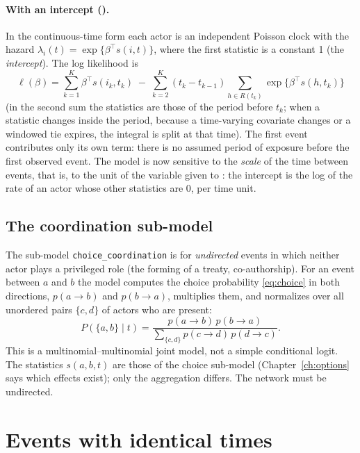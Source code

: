 \paragraph{With an intercept ().} In the continuous-time form each actor is an independent Poisson clock with the hazard $\lambda_i(t)=\exp\{\beta^{\top}s(i,t)\}$, where the first statistic is a constant 1 (the \emph{intercept}). The log likelihood is
\begin{equation}\label{eq:rateint}
  \ell(\beta)=\sum_{k=1}^{K}\beta^{\top}s(i_k,t_k)\;-\;\sum_{k=2}^{K}(t_k-t_{k-1})\sum_{h\in R(t_k)}\exp\{\beta^{\top}s(h,t_k)\}
\end{equation}
(in the second sum the statistics are those of the period before $t_k$; when a statistic changes inside the period, because a time-varying covariate changes or a windowed tie expires, the integral is split at that time). The first event contributes only its own term: there is no assumed period of exposure before the first observed event. The model is now sensitive to the \emph{scale} of the time between events, that is, to the unit of the variable given to : the intercept is the log of the rate of an actor whose other statistics are 0, per time unit.

\subsection{The coordination sub-model}\label{sec:coordmodel}

The sub-model \texttt{choice\_coordination} is for \emph{undirected} events in which neither actor plays a privileged role (the forming of a treaty, co-authorship). For an event between $a$ and $b$ the model computes the choice probability \eqref{eq:choice} in both directions, $p(a\to b)$ and $p(b\to a)$, multiplies them, and normalizes over all unordered pairs $\{c,d\}$ of actors who are present:
\begin{equation}\label{eq:coord}
  P(\{a,b\}\mid t)=\frac{p(a\to b)\,p(b\to a)}{\sum_{\{c,d\}}p(c\to d)\,p(d\to c)}.
\end{equation}
This is a multinomial--multinomial joint model, not a simple conditional logit. The statistics $s(a,b,t)$ are those of the choice sub-model (Chapter~\ref{ch:options} says which effects exist); only the aggregation differs. The network must be undirected.

\section{Events with identical times}\label{sec:ties}

